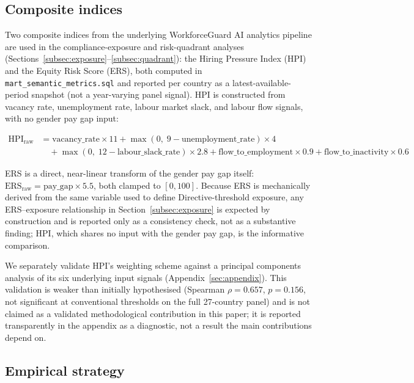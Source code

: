 \documentclass[12pt,a4paper]{article}
\begin{document}
\subsection{Composite indices}
\label{subsec:composites}

Two composite indices from the underlying WorkforceGuard AI analytics pipeline
are used in the compliance-exposure and risk-quadrant analyses
(Sections~\ref{subsec:exposure}--\ref{subsec:quadrant}): the Hiring Pressure Index
(HPI) and the Equity Risk Score (ERS), both computed in
\texttt{mart\_semantic\_metrics.sql} and reported per country as a
latest-available-period snapshot (not a year-varying panel signal).  HPI is
constructed from vacancy rate, unemployment rate, labour market slack, and labour
flow signals, with no gender pay gap input:

\begin{align*}
\text{HPI}_\text{raw} &= \text{vacancy\_rate} \times 11
  + \max(0,\;9 - \text{unemployment\_rate}) \times 4 \\
  &\quad + \max(0,\;12 - \text{labour\_slack\_rate}) \times 2.8
  + \text{flow\_to\_employment} \times 0.9
  + \text{flow\_to\_inactivity} \times 0.6
\end{align*}

ERS is a direct, near-linear transform of the gender pay gap itself:
$\text{ERS}_\text{raw} = \text{pay\_gap} \times 5.5$, both clamped to
$[0, 100]$.  Because ERS is mechanically derived from the same variable used to
define Directive-threshold exposure, any ERS--exposure relationship in
Section~\ref{subsec:exposure} is expected by construction and is reported only as
a consistency check, not as a substantive finding; HPI, which shares no input
with the gender pay gap, is the informative comparison.

We separately validate HPI's weighting scheme against a principal components
analysis of its six underlying input signals (Appendix~\ref{sec:appendix}).
This validation is weaker than initially hypothesised (Spearman
$\rho = 0.657$, $p = 0.156$, not significant at conventional thresholds on the
full 27-country panel) and is not claimed as a validated methodological
contribution in this paper; it is reported transparently in the appendix as a
diagnostic, not a result the main contributions depend on.

\subsection{Empirical strategy}
\label{subsec:strategy}
\end{document}
